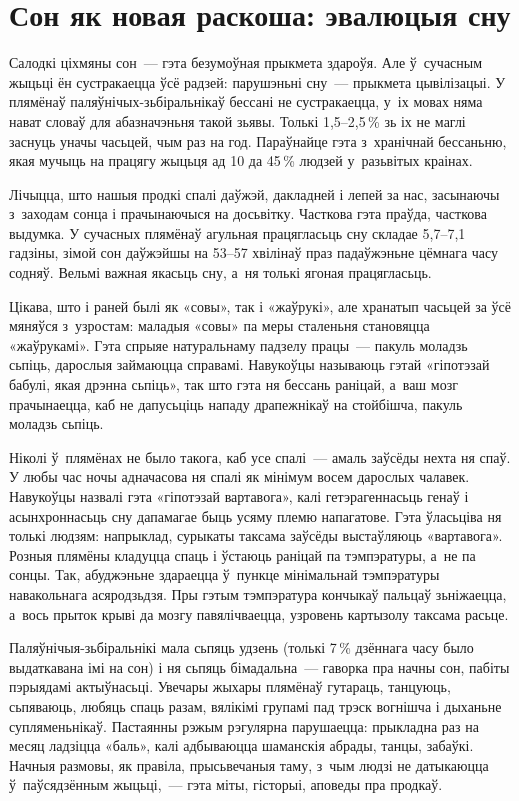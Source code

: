 \section{Сон як новая раскоша: эвалюцыя сну}

Салодкі ціхмяны сон~--- гэта безумоўная прыкмета здароўя. Але ў~сучасным жыцьці ён сустракаецца ўсё радзей: парушэньні сну~--- прыкмета цывілізацыі. У плямёнаў паляўнічых-зьбіральнікаў бессані не сустракаецца, у~іх мовах няма нават словаў для абазначэньня такой зьявы. Толькі 1,5--2,5\,\% зь іх не маглі заснуць уначы часьцей, чым раз на год. Параўнайце гэта з~хранічнай бессаньню, якая мучыць на працягу жыцьця ад 10 да 45\,\% людзей у~разьвітых краінах.

Лічыцца, што нашыя продкі спалі даўжэй, дакладней і лепей за нас, засынаючы з~заходам сонца і прачынаючыся на досьвітку. Часткова гэта праўда, часткова выдумка. У сучасных плямёнаў агульная працягласьць сну складае 5,7--7,1 гадзіны, зімой сон даўжэйшы на 53--57 хвілінаў праз падаўжэньне цёмнага часу содняў. Вельмі важная якасьць сну, а~ня толькі ягоная працягласьць.

Цікава, што і раней былі як «совы», так і «жаўрукі», але хранатып часьцей за ўсё мяняўся з~узростам: маладыя «совы» па меры сталеньня становяцца «жаўрукамі». Гэта спрыяе натуральнаму падзелу працы~--- пакуль моладзь сьпіць, дарослыя займаюцца справамі. Навукоўцы называюць гэтай «гіпотэзай бабулі, якая дрэнна сьпіць», так што гэта ня бессань раніцай, а~ваш мозг прачынаецца, каб не дапусьціць нападу драпежнікаў на стойбішча, пакуль моладзь сьпіць.

Ніколі ў~плямёнах не было такога, каб усе спалі~--- амаль заўсёды нехта ня спаў. У любы час ночы адначасова ня спалі як мінімум восем дарослых чалавек. Навукоўцы назвалі гэта «гіпотэзай вартавога», калі гетэрагеннасьць генаў і асынхроннасьць сну дапамагае быць усяму племю напагатове. Гэта ўласьціва ня толькі людзям: напрыклад, сурыкаты таксама заўсёды выстаўляюць «вартавога». Розныя плямёны кладуцца спаць і ўстаюць раніцай па тэмпэратуры, а~не па сонцы. Так, абуджэньне здараецца ў~пункце мінімальнай тэмпэратуры навакольнага асяродзьдзя. Пры гэтым тэмпэратура кончыкаў пальцаў зьніжаецца, а~вось прыток крыві да мозгу павялічваецца, узровень картызолу таксама расьце.

Паляўнічыя-зьбіральнікі мала сьпяць удзень (толькі 7\,\% дзённага часу было выдаткавана імі на сон) і ня сьпяць бімадальна~--- гаворка пра начны сон, пабіты пэрыядамі актыўнасьці. Увечары жыхары плямёнаў гутараць, танцуюць, сьпяваюць, любяць спаць разам, вялікімі групамі пад трэск вогнішча і дыханьне супляменьнікаў. Пастаянны рэжым рэгулярна парушаецца: прыкладна раз на месяц ладзіцца «баль», калі адбываюцца шаманскія абрады, танцы, забаўкі. Начныя размовы, як правіла, прысьвечаныя таму, з~чым людзі не датыкаюцца ў~паўсядзённым жыцьці,~--- гэта міты, гісторыі, аповеды пра продкаў.


